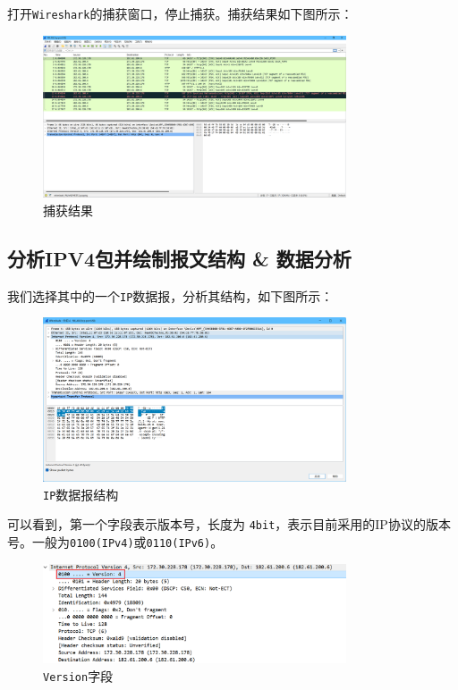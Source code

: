 \documentclass{article}
\begin{document}
打开\texttt{Wireshark}的捕获窗口，停止捕获。捕获结果如下图所示：

\begin{figure}[H]
  \centering
  \includegraphics[width=0.8\textwidth]{img/3.png}
  \caption{捕获结果}
  \label{fig:3}
\end{figure}


\subsection{分析IPV4包并绘制报文结构 \& 数据分析}

我们选择其中的一个\texttt{IP}数据报，分析其结构，如下图所示：

\begin{figure}[H]
  \centering
  \includegraphics[width=0.8\textwidth]{img/4.png}
  \caption{\texttt{IP}数据报结构}
  \label{fig:4}
\end{figure}

可以看到，第一个字段表示版本号，长度为 \texttt{4bit}，表示目前采用的IP协议的版本号。一般为\texttt{0100(IPv4)}或\texttt{0110(IPv6)}。

\begin{figure}[H]
  \centering
  \includegraphics[width=0.8\textwidth]{img/4_1.png}
  \caption{\texttt{Version}字段}
  \label{fig:5}
\end{figure}
\end{document}
